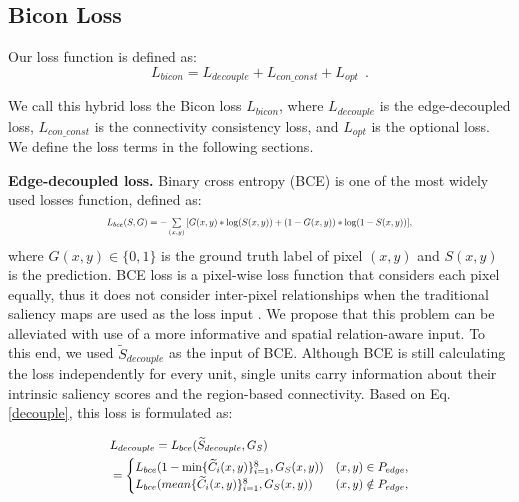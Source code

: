 \documentclass[final]{cvpr}
\newcommand*{\Scale}[2][4]{\scalebox{#1}{$#2$}}%
\begin{document}
\subsection{Bicon Loss}
Our loss function is defined as:
\begin{equation}
{L_{bicon}} = {L_{decouple}} + {L_{con\_const}} + {L_{opt}}\ \ .
\end{equation}


We call this hybrid loss the Bicon loss $L_{bicon}$, where $L_{decouple}$ is the edge-decoupled loss, $L_{con\_const}$ is the connectivity consistency loss, and $L_{opt}$ is the optional loss. We define the loss terms in the following sections.


\textbf{Edge-decoupled loss.} Binary cross entropy (BCE) \cite{BCE} is one of the most widely used losses function, defined as:
\begin{equation}
\vspace{-3pt}
\Scale[0.66]{ L_{bce}(S,G) = -\sum\limits_{(x,y)} {[G(x,y)*\log (} {S}(x,y)) + (1 - {G}(x,y))*\log (1 - S(x,y))],}
\end{equation}
where $G(x,y)\in \{0,1\}$ is the ground truth label of pixel $(x,y)$ and $S(x,y)$ is the prediction. BCE loss is a pixel-wise loss function that considers each pixel equally, thus it does not consider inter-pixel relationships when the traditional saliency maps are used as the loss input \cite{MINet,f-loss,basnet}. We propose that this problem can be alleviated with use of a more informative and spatial relation-aware input. To this end, we used $\widetilde S_{decouple}$ as the input of BCE. Although BCE is still calculating the loss independently for every unit, single units carry information about their intrinsic saliency scores and the region-based connectivity. Based on Eq. \ref{decouple}, this loss is formulated as:

\begin{equation}
\Scale[0.85]{
\begin{aligned}
&{L_{decouple}} = {L_{bce}}({\widetilde S_{decouple}},{G_S})\\
& =\begin{cases}
{{L_{bce}}(1 - \min \{ {{\widetilde C}_i}(x,y)\} _{i = 1}^8,{G_S}(x,y))} &{(x,y)\in {P_{edge}}},\\
{{L_{bce}}(mean\{ {{\widetilde C}_i}(x,y)\} _{i = 1}^8,{G_S}(x,y))}& {(x,y) \notin {P_{edge}}},
\end{cases}
\end{aligned}}
\end{equation}
\end{document}
